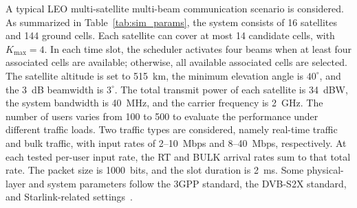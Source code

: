 \documentclass[journal]{IEEEtran}
\newcommand{\revbegin}[1]{\color{revisionblue}\ignorespaces}
\newcommand{\revend}[1]{\color{black}\ignorespaces}
\begin{document}
\revbegin{}A typical LEO multi-satellite multi-beam communication scenario is considered. As summarized in Table~\ref{tab:sim_params}, the system consists of 16 satellites and 144 ground cells. Each satellite can cover at most 14 candidate cells, with $K_{\max}=4$. In each time slot, the scheduler activates four beams when at least four associated cells are available; otherwise, all available associated cells are selected. The satellite altitude is set to 515~km, the minimum elevation angle is $40^\circ$, and the 3~dB beamwidth is $3^\circ$. The total transmit power of each satellite is 34~dBW, the system bandwidth is 40~MHz, and the carrier frequency is 2~GHz. The number of users varies from 100 to 500 to evaluate the performance under different traffic loads. Two traffic types are considered, namely real-time traffic and bulk traffic, with input rates of 2--10~Mbps and 8--40~Mbps, respectively. At each tested per-user input rate, the RT and BULK arrival rates sum to that total rate. The packet size is 1000~bits, and the slot duration is 2~ms. Some physical-layer and system parameters follow the 3GPP standard, the DVB-S2X standard, and Starlink-related settings~\cite{ref29,ref33,ref34}.\revend{}
\end{document}
